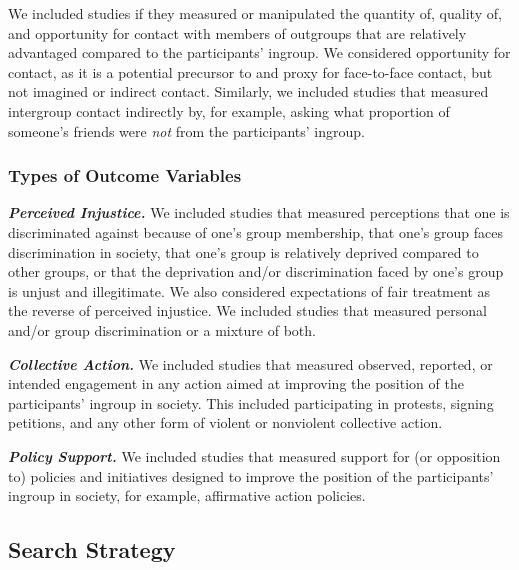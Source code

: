 \documentclass[12pt, letterpaper]{article}
\begin{document}
We included studies if they measured or manipulated the quantity of,
quality of, and opportunity for contact with members of outgroups that
are relatively advantaged compared to the participants' ingroup. We
considered opportunity for contact, as it is a potential precursor to
and proxy for face-to-face contact, but not imagined or indirect
contact. Similarly, we included studies that measured intergroup contact
indirectly by, for example, asking what proportion of someone's friends
were \emph{not} from the participants' ingroup.

\hypertarget{types-of-outcome-variables}{%
\subsubsection{Types of Outcome
Variables}\label{types-of-outcome-variables}}

\textbf{\emph{Perceived Injustice.}} We included studies that measured
perceptions that one is discriminated against because of one's group
membership, that one's group faces discrimination in society, that one's
group is relatively deprived compared to other groups, or that the
deprivation and/or discrimination faced by one's group is unjust and
illegitimate. We also considered expectations of fair treatment as the
reverse of perceived injustice. We included studies that measured
personal and/or group discrimination or a mixture of both.

\textbf{\emph{Collective Action.}} We included studies that measured
observed, reported, or intended engagement in any action aimed at
improving the position of the participants' ingroup in society. This
included participating in protests, signing petitions, and any other
form of violent or nonviolent collective action.

\textbf{\emph{Policy Support.}} We included studies that measured
support for (or opposition to) policies and initiatives designed to
improve the position of the participants' ingroup in society, for
example, affirmative action policies.

\hypertarget{search-strategy}{%
\subsection{Search Strategy}\label{search-strategy}}
\end{document}
